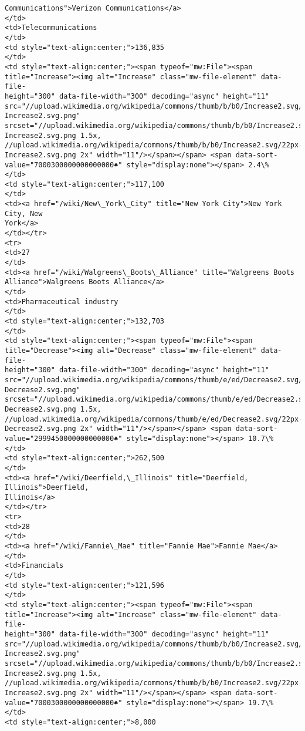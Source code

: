\documentclass[11pt]{article}
\begin{document}
\begin{Verbatim}[commandchars=\\\{\}]
Communications">Verizon Communications</a>
</td>
<td>Telecommunications
</td>
<td style="text-align:center;">136,835
</td>
<td style="text-align:center;"><span typeof="mw:File"><span
title="Increase"><img alt="Increase" class="mw-file-element" data-file-
height="300" data-file-width="300" decoding="async" height="11"
src="//upload.wikimedia.org/wikipedia/commons/thumb/b/b0/Increase2.svg/11px-
Increase2.svg.png"
srcset="//upload.wikimedia.org/wikipedia/commons/thumb/b/b0/Increase2.svg/17px-
Increase2.svg.png 1.5x,
//upload.wikimedia.org/wikipedia/commons/thumb/b/b0/Increase2.svg/22px-
Increase2.svg.png 2x" width="11"/></span></span> <span data-sort-
value="7000300000000000000♠" style="display:none"></span> 2.4\%
</td>
<td style="text-align:center;">117,100
</td>
<td><a href="/wiki/New\_York\_City" title="New York City">New York City, New
York</a>
</td></tr>
<tr>
<td>27
</td>
<td><a href="/wiki/Walgreens\_Boots\_Alliance" title="Walgreens Boots
Alliance">Walgreens Boots Alliance</a>
</td>
<td>Pharmaceutical industry
</td>
<td style="text-align:center;">132,703
</td>
<td style="text-align:center;"><span typeof="mw:File"><span
title="Decrease"><img alt="Decrease" class="mw-file-element" data-file-
height="300" data-file-width="300" decoding="async" height="11"
src="//upload.wikimedia.org/wikipedia/commons/thumb/e/ed/Decrease2.svg/11px-
Decrease2.svg.png"
srcset="//upload.wikimedia.org/wikipedia/commons/thumb/e/ed/Decrease2.svg/17px-
Decrease2.svg.png 1.5x,
//upload.wikimedia.org/wikipedia/commons/thumb/e/ed/Decrease2.svg/22px-
Decrease2.svg.png 2x" width="11"/></span></span> <span data-sort-
value="2999450000000000000♠" style="display:none"></span> 10.7\%
</td>
<td style="text-align:center;">262,500
</td>
<td><a href="/wiki/Deerfield,\_Illinois" title="Deerfield, Illinois">Deerfield,
Illinois</a>
</td></tr>
<tr>
<td>28
</td>
<td><a href="/wiki/Fannie\_Mae" title="Fannie Mae">Fannie Mae</a>
</td>
<td>Financials
</td>
<td style="text-align:center;">121,596
</td>
<td style="text-align:center;"><span typeof="mw:File"><span
title="Increase"><img alt="Increase" class="mw-file-element" data-file-
height="300" data-file-width="300" decoding="async" height="11"
src="//upload.wikimedia.org/wikipedia/commons/thumb/b/b0/Increase2.svg/11px-
Increase2.svg.png"
srcset="//upload.wikimedia.org/wikipedia/commons/thumb/b/b0/Increase2.svg/17px-
Increase2.svg.png 1.5x,
//upload.wikimedia.org/wikipedia/commons/thumb/b/b0/Increase2.svg/22px-
Increase2.svg.png 2x" width="11"/></span></span> <span data-sort-
value="7000300000000000000♠" style="display:none"></span> 19.7\%
</td>
<td style="text-align:center;">8,000

\end{Verbatim}
\end{document}
